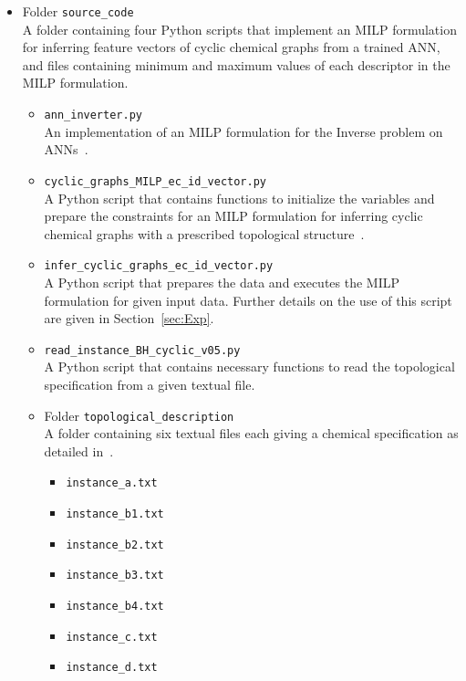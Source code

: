 \documentclass[11pt, titlepage, dvipdfmx, twoside]{article}
\begin{document}
\begin{itemize}

\item Folder {\tt source\_code}\\
A folder containing four Python scripts that implement
an MILP formulation for inferring feature vectors
of cyclic chemical graphs from a trained ANN,
and files containing minimum and maximum values
of each descriptor
in the MILP formulation.

\begin{itemize}

\item {\tt ann\_inverter.py}\\
An implementation of an MILP formulation 
for the Inverse problem on  ANNs~\cite{AN19}.

\item {\tt cyclic\_graphs\_MILP\_ec\_id\_vector.py}\\
A Python script that contains functions to initialize the variables and prepare 
the constraints for an MILP
formulation for inferring cyclic chemical graphs with 
a prescribed topological structure~\cite{cyclic_BH_arxiv}.

\item {\tt infer\_cyclic\_graphs\_ec\_id\_vector.py}\\
A Python script that prepares the data and executes 
the MILP formulation for given input data.
Further details on the use of this script
are given in Section~\ref{sec:Exp}.

\item {\tt read\_instance\_BH\_cyclic\_v05.py}\\
A Python script that contains necessary functions
to read the topological specification from a given textual file.

\item Folder {\tt topological\_description}\\
A folder containing six textual files each giving a chemical specification as detailed 
in~\cite{cyclic_BH_arxiv}.
%
\begin{itemize}
 \item {\tt instance\_a.txt} 
 \item {\tt instance\_b1.txt} 
 \item {\tt instance\_b2.txt} 
 \item {\tt instance\_b3.txt}
 \item {\tt instance\_b4.txt}  
 \item {\tt instance\_c.txt} 
 \item {\tt instance\_d.txt} 
\end{itemize}


\end{itemize}
\end{itemize}
\end{document}
